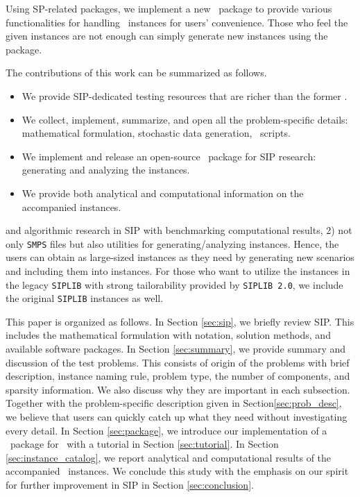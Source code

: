 Using SP-related packages, we implement a new \julia\ package to provide various 
functionalities for handling \siplibtwo\ instances for users' convenience. Those who feel the 
given instances are not enough can simply generate new instances using the package.


The contributions of this work can be summarized as follows.
\begin{itemize}
	\item We provide SIP-dedicated testing resources that are richer than the former \siplib.
	\item We collect, implement, summarize, and open all the problem-specific details: 
mathematical formulation, stochastic data generation, \julia\ scripts.
	\item We implement and release an open-source \julia\ package for SIP research: 
generating and analyzing the instances.
	\item We provide both analytical and computational information on the accompanied 
instances.
\end{itemize}

and algorithmic research in SIP with benchmarking computational results, 2) not only 
\texttt{SMPS} files but also utilities for generating/analyzing instances. Hence, the users 
can obtain as large-sized instances as they need by generating new scenarios and including 
them into instances. For those who want to utilize the instances in the legacy 
\texttt{SIPLIB} with strong tailorability provided by \texttt{SIPLIB 2.0}, we include the 
original \texttt{SIPLIB} instances as well.

This paper is organized as follows. In Section \ref{sec:sip}, we briefly review SIP. This 
includes the mathematical formulation with notation, solution methods, and available software 
packages. In Section \ref{sec:summary}, we provide summary and discussion of the test 
problems. This consists of origin of the problems with brief description, instance naming 
rule, problem type, the number of components, and sparsity information. We also discuss why 
they are important in each subsection. Together with the problem-specific description given 
in Section\ref{sec:prob_desc}, we believe that users can quickly catch up what they need 
without investigating every detail. In Section \ref{sec:package}, we introduce our 
implementation of a \julia\ package for \siplibtwo\ with a tutorial in Section 
\ref{sec:tutorial}. In Section \ref{sec:instance_catalog}, we report analytical and 
computational results of the accompanied \smps\ instances. We conclude this study with the 
emphasis on our spirit for further improvement in SIP in Section \ref{sec:conclusion}. 







